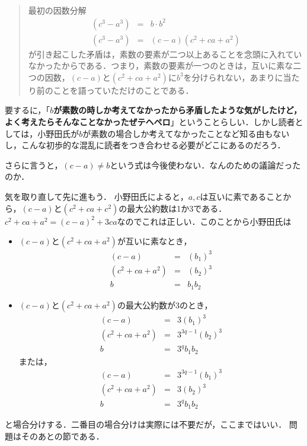 \begin{quote}
最初の因数分解
\begin{eqnarray*}
(c^3-a^3)&=&b\cdot b^2\\
(c^3-a^3)&=&(c-a)(c^2+ca+a^2)
\end{eqnarray*}
が引き起こした矛盾は，素数の要素が二つ以上あることを念頭に入れていなかったからである．つまり，素数の要素が一つのときは，互いに素な二つの因数，$(c-a)$と$(c^2+ca+a^2)$に$b^3$を分けられない，あまりに当たり前のことを語っていただけのことである．
\end{quote}

要するに，「\textbf{$b$が素数の時しか考えてなかったから矛盾したような気がしたけど，よく考えたらそんなことなかったぜテヘペロ}」ということらしい．しかし読者としては，小野田氏が$b$が素数の場合しか考えてなかったことなど知る由もないし，こんな初歩的な混乱に読者をつき合わせる必要がどこにあるのだろう．

さらに言うと，$(c-a)\neq b$という式は今後使わない．なんのための議論だったのか．



気を取り直して先に進もう．
小野田氏によると，$a,c$は互いに素であることから，$(c-a)$と$(c^2+ca+c^2)$の最大公約数は1か3である．$c^2+ca+a^2=(c-a)^2+3ca$なのでこれは正しい．このことから小野田氏は

\begin{itemize}
\item $(c-a)$と$(c^2+ca+a^2)$が互いに素なとき，
\begin{eqnarray*}
(c-a)&=&(b_1)^3\\
(c^2+ca+a^2)&=&(b_2)^3\\
b&=&b_1b_2
\end{eqnarray*}

\item $(c-a)$と$(c^2+ca+a^2)$の最大公約数が3のとき，
\begin{eqnarray*}
(c-a)&=&3(b_1)^3\\
(c^2+ca+a^2)&=&3^{3q-1}(b_2)^3\\
b&=&3^qb_1b_2
\end{eqnarray*}
または，
\begin{eqnarray*}
(c-a)&=&3^{3q-1}(b_1)^3\\
(c^2+ca+a^2)&=&3(b_2)^3\\
b&=&3^qb_1b_2
\end{eqnarray*}
\end{itemize}

と場合分けする．二番目の場合分けは実際には不要だが，ここまではいい．
問題はそのあとの節である．

